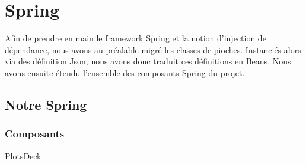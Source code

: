 \chapter{Spring}
\label{spring}

Afin de prendre en main le framework Spring et la notion d'injection de dépendance, nous avons au préalable migré les classes de pioches. Instanciés alors via des définition Json, nous avons donc traduit ces définitions en Beans. Nous avons ensuite étendu l'ensemble des composants Spring du projet.

\section{Notre Spring}

\subsection{Composants}

\begin{list}
    \item PlotsDeck
\end{list}